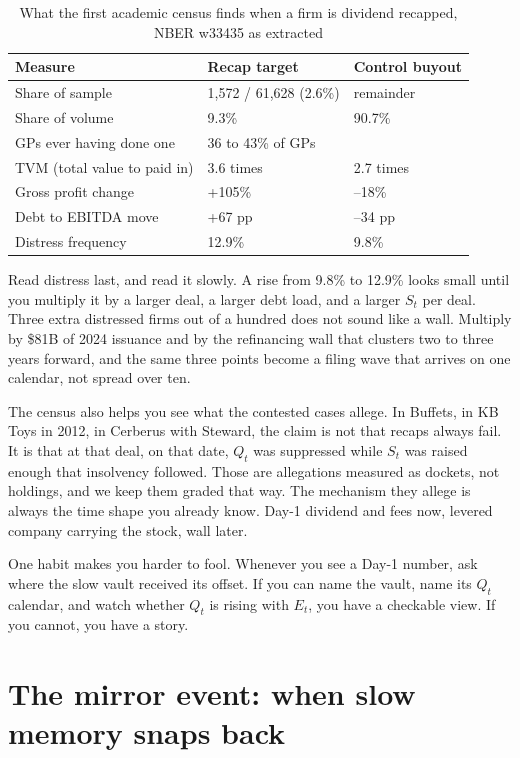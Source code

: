 \begin{table}[h]
\centering
\small
\caption{What the first academic census finds when a firm is dividend recapped, NBER w33435 as extracted}
\label{tab:recap-census}
\begin{tabular}{p{4.2cm} p{2.6cm} p{2.6cm}}
\toprule
Measure & Recap target & Control buyout \\
\midrule
Share of sample & 1,572 / 61,628 (2.6\%) & remainder \\
Share of volume & 9.3\% & 90.7\% \\
GPs ever having done one & 36 to 43\% of GPs &  \\
TVM (total value to paid in) & 3.6 times & 2.7 times \\
Gross profit change & +105\% & --18\% \\
Debt to EBITDA move & +67 pp & --34 pp \\
Distress frequency & 12.9\% & 9.8\% \\
\bottomrule
\end{tabular}
\end{table}

Read distress last, and read it slowly. A rise from 9.8\% to 12.9\% looks small until you multiply it by a larger deal, a larger debt load, and a larger $S_t$ per deal. Three extra distressed firms out of a hundred does not sound like a wall. Multiply by \$81B of 2024 issuance and by the refinancing wall that clusters two to three years forward, and the same three points become a filing wave that arrives on one calendar, not spread over ten.

The census also helps you see what the contested cases allege. In Buffets, in KB Toys in 2012, in Cerberus with Steward, the claim is not that recaps always fail. It is that at that deal, on that date, $Q_t$ was suppressed while $S_t$ was raised enough that insolvency followed. Those are allegations measured as dockets, not holdings, and we keep them graded that way. The mechanism they allege is always the time shape you already know. Day-1 dividend and fees now, levered company carrying the stock, wall later.

One habit makes you harder to fool. Whenever you see a Day-1 number, ask where the slow vault received its offset. If you can name the vault, name its $Q_t$ calendar, and watch whether $Q_t$ is rising with $E_t$, you have a checkable view. If you cannot, you have a story.

\section{The mirror event: when slow memory snaps back}

